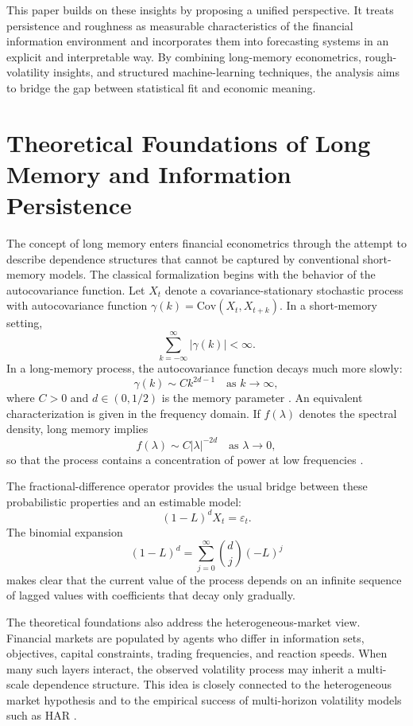 \documentclass[12pt]{article}
\begin{document}
This paper builds on these insights by proposing a unified perspective. It treats persistence and roughness as measurable characteristics of the financial information environment and incorporates them into forecasting systems in an explicit and interpretable way. By combining long-memory econometrics, rough-volatility insights, and structured machine-learning techniques, the analysis aims to bridge the gap between statistical fit and economic meaning.

\section{Theoretical Foundations of Long Memory and Information Persistence}
\label{sec:theory}

The concept of long memory enters financial econometrics through the attempt to describe dependence structures that cannot be captured by conventional short-memory models. The classical formalization begins with the behavior of the autocovariance function. Let $X_t$ denote a covariance-stationary stochastic process with autocovariance function $\gamma(k) = \mathrm{Cov}(X_t, X_{t+k})$. In a short-memory setting,
\[
\sum_{k=-\infty}^{\infty} |\gamma(k)| < \infty.
\]
In a long-memory process, the autocovariance function decays much more slowly:
\[
\gamma(k) \sim C k^{2d-1} \quad \text{as } k \to \infty,
\]
where $C > 0$ and $d \in (0, 1/2)$ is the memory parameter \citep{GrangerJoyeux1980, Hosking1981}. An equivalent characterization is given in the frequency domain. If $f(\lambda)$ denotes the spectral density, long memory implies
\[
f(\lambda) \sim C |\lambda|^{-2d} \quad \text{as } \lambda \to 0,
\]
so that the process contains a concentration of power at low frequencies \citep{Robinson1995}.

The fractional-difference operator provides the usual bridge between these probabilistic properties and an estimable model:
\[
(1-L)^d X_t = \varepsilon_t.
\]
The binomial expansion
\[
(1-L)^d = \sum_{j=0}^{\infty} \binom{d}{j} (-L)^j
\]
makes clear that the current value of the process depends on an infinite sequence of lagged values with coefficients that decay only gradually.

The theoretical foundations also address the heterogeneous-market view. Financial markets are populated by agents who differ in information sets, objectives, capital constraints, trading frequencies, and reaction speeds. When many such layers interact, the observed volatility process may inherit a multi-scale dependence structure. This idea is closely connected to the heterogeneous market hypothesis and to the empirical success of multi-horizon volatility models such as HAR \citep{Corsi2009, Muller1997}.
\end{document}
